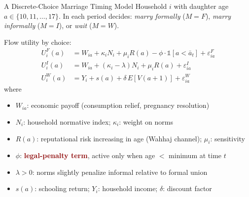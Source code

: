 \documentclass[aspectratio=169,10pt]{beamer}
\newcommand{\hl}[1]{\textcolor{darkred}{\textbf{#1}}}
\begin{document}
\begin{frame}{A Discrete-Choice Marriage Timing Model}
    Household $i$ with daughter age $a \in \{10, 11, \dots, 17\}$. In each period decides: \emph{marry formally} ($M=F$), \emph{marry informally} ($M=I$), or \emph{wait} ($M=W$).
    \vspace{0.2cm}

    Flow utility by choice:
    \begin{align*}
        U_i^F(a) &= W_{ia} + \kappa_i N_i + \mu_i R(a) - \phi \cdot \mathbb{1}[a < \bar{a}_t] + \varepsilon_{ia}^F \\
        U_i^I(a) &= W_{ia} + (\kappa_i - \lambda) N_i + \mu_i R(a) + \varepsilon_{ia}^I \\
        U_i^W(a) &= Y_i + s(a) + \delta\, E[V(a+1)] + \varepsilon_{ia}^W
    \end{align*}
    where
    \begin{itemize}\small
        \item $W_{ia}$: economic payoff (consumption relief, pregnancy resolution)
        \item $N_i$: household normative index; $\kappa_i$: weight on norms
        \item $R(a)$: reputational risk increasing in age (Wahhaj channel); $\mu_i$: sensitivity
        \item $\phi$: \hl{legal-penalty term}, active only when age $<$ minimum at time $t$
        \item $\lambda > 0$: norms slightly penalize informal relative to formal union
        \item $s(a)$: schooling return; $Y_i$: household income; $\delta$: discount factor
    \end{itemize}
\end{frame}
\end{document}

